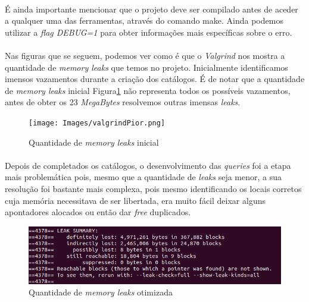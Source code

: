 \documentclass{article}
\begin{document}
\paragraph{}É ainda importante mencionar que o projeto deve ser compilado antes de aceder a qualquer uma das ferramentas, através do comando make. Ainda podemos utilizar a \textit{flag DEBUG=1} para obter informações mais específicas sobre o erro.

\paragraph{}Nas figuras que se seguem, podemos ver como é que o \textit{Valgrind} nos mostra a quantidade de \textit{memory leaks} que temos no projeto. Inicialmente identificamos imensos vazamentos durante a criação dos catálogos. É de notar que a quantidade de \textit{memory leaks} inicial Figura\ref{Figura1Valgrind} não representa todos os possíveis vazamentos, antes de obter os 23 \textit{MegaBytes} resolvemos outras imensas \textit{leaks}.
\begin{figure}[H]
\begin{center}
	\texttt{[image: Images/valgrindPior.png]} 
        \caption{Quantidade de \textit{memory leaks} inicial}
        \label{Figura1Valgrind}
\end{center}
\end{figure}
\paragraph{}Depois de completados os catálogos, o desenvolvimento das \textit{queries} foi a etapa mais problemática pois, mesmo que a quantidade de \textit{leaks} seja menor, a sua resolução foi bastante mais complexa, pois mesmo identificando os locais corretos cuja memória necessitava de ser libertada, era muito fácil deixar alguns apontadores alocados ou então dar \textit{free} duplicados. 
\begin{figure}[H]
\begin{center}
	\includegraphics[width=15cm]{Images/valgrindMédio.png} 
        \caption{Quantidade de \textit{memory leaks} otimizada}
        \label{Figura2Valgrind}
\end{center}
\end{figure}
\end{document}
